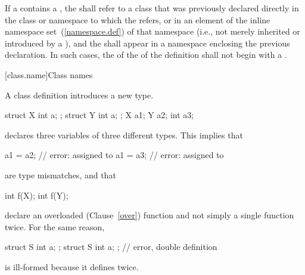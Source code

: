 \pnum
If a  contains a ,
the  shall refer to a class that was
previously declared directly in the class or namespace to which the
 refers,
or in an element of the inline namespace set~(\ref{namespace.def}) of that namespace
(i.e., not merely inherited or
introduced by a ), and the
 shall appear in a namespace enclosing the
previous declaration.
In such cases, the  of the
 of the
definition shall not begin with a .

[class.name]{Class names}
%
%
%

\pnum
A class definition introduces a new type.
\begin{example}

\begin{codeblock}
struct X { int a; };
struct Y { int a; };
X a1;
Y a2;
int a3;
\end{codeblock}

declares three variables of three different types. This implies that

\begin{codeblock}
a1 = a2;                        // error:  assigned to 
a1 = a3;                        // error:  assigned to 
\end{codeblock}

are type mismatches, and that

\begin{codeblock}
int f(X);
int f(Y);
\end{codeblock}

%
declare an overloaded (Clause~\ref{over}) function  and not
simply a single function  twice. For the same reason,

\begin{codeblock}
struct S { int a; };
struct S { int a; };            // error, double definition
\end{codeblock}

is ill-formed because it defines  twice.
\end{example}

